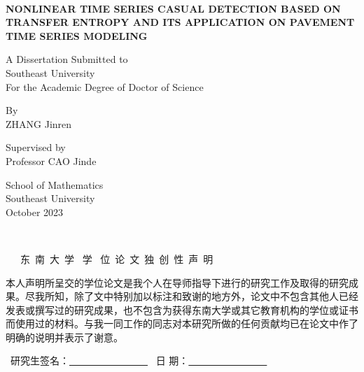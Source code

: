 \documentclass[a4paper,UTF8,12pt]{ctexbook}
\begin{document}
\newpage %
\thispagestyle{empty}~~~~~~~~~~~~~~~~~~~\vspace{3 mm}

\newpage
\thispagestyle{empty}
\vskip 3cm
\begin{center}
    {\Huge\bf \MakeUppercase{Nonlinear time series casual detection based on transfer entropy and its application on pavement time series modeling }}
\end{center}

\vskip 2cm
\begin{center}
    {\Large A Dissertation Submitted to \\
        Southeast University\\
        For the Academic Degree of Doctor of Science}
\end{center}

\vskip 2.5cm
\begin{center}{\Large By\\ ZHANG Jinren
}\end{center}

\vskip 1.5cm
\begin{center}{\Large Supervised by\\ Professor CAO Jinde 
}\end{center}

\vskip 4cm
\begin{center}
    {\Large School of Mathematics\\
        Southeast University \\
        October 2023}
\end{center}

	\newpage
	\thispagestyle{empty}~~~~~~~~~~~~~~~~~~~~~\vspace{3 mm}
%	
\newpage
\thispagestyle{empty}
\begin{center}
    {\heiti{}\qquad\ \ \
        东\  南\  大\  学 \ 学 \ 位\  论\  文\  独\  创\  性\  声\  明 \ \ \ }
\end{center}

\vskip 1cm
本人声明所呈交的学位论文是我个人在导师指导下进行的研究工作及取得的研究成果。尽我所知，除了文中特别加以标注和致谢的地方外，论文中不包含其他人已经发表或撰写过的研究成果，也不包含为获得东南大学或其它教育机构的学位或证书而使用过的材料。与我一同工作的同志对本研究所做的任何贡献均已在论文中作了明确的说明并表示了谢意。

\vskip 2cm \qquad \qquad\qquad \ 研究生签名：\underline{\ \ \ \ \ \
    \ \ \ \ \ \ \ \ \ \ } \qquad \qquad\qquad \  日  期：\underline{\ \
    \ \ \ \ \ \ \ \ \ \ \ \ \ \ }
\end{document}
